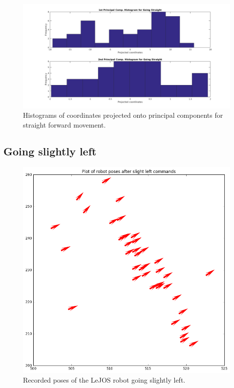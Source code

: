 \documentclass[paper=a4, fontsize=11pt]{scrartcl} %
\begin{document}
    \begin{figure}[h!]
        \begin{center}
            \setlength{\fboxsep}{0.5pt} %
            \setlength{\fboxrule}{0.5pt}
            \includegraphics[width=\linewidth,fbox]{images/pca_histogram_straight.png}
            \caption{Histograms of coordinates projected onto principal components for straight forward movement.}
        \end{center}
    \end{figure}

    \subsection{Going slightly left}
    \begin{figure}[h!]
        \begin{center}
            \setlength{\fboxsep}{0.5pt} %
            \setlength{\fboxrule}{0.5pt}
            \includegraphics[width=0.7\linewidth,fbox]{images/poses_plot_2_slightLeft.png}
            \caption{Recorded poses of the LeJOS robot going slightly left.}
        \end{center}
    \end{figure}
\end{document}
